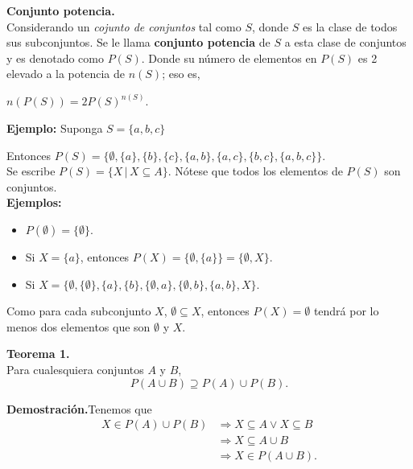\noindent \textbf{Conjunto potencia.} \\
Considerando un \textit{cojunto de conjuntos} tal como $S$, donde $S$ es la clase de todos sus subconjuntos. Se le llama \textbf{conjunto potencia} de $S$ a esta clase de conjuntos y es denotado como $P(S)$. 
Donde su n\'umero de elementos en $P(S)$ es 2 elevado a la potencia de $n(S)$; eso es,

    \begin{center}
        $n(P(S)) = 2 P(S)^{n(S)}$.
    \end{center}

    \textbf{Ejemplo:}
        Suponga $S = \lbrace a,b,c\rbrace$ \\ \vspace{5px}

        Entonces $P(S) = \lbrace \emptyset, \lbrace a\rbrace,  \lbrace b\rbrace,  \lbrace c\rbrace,  \lbrace a, b\rbrace,  \lbrace a, c\rbrace, \lbrace b, c\rbrace, \lbrace a,b,c\rbrace \rbrace$.\\

    Se escribe $P(S) = \{X \,|\, X \subseteq A\}$. Nótese que todos los elementos de $P(S)$ son conjuntos.\\



\textbf{Ejemplos:} 
\begin{itemize}
    \item $P(\emptyset) = \{\emptyset\}$.
    \item Si $X = \{a\}$, entonces $P(X) = \{\emptyset, \{a\}\} = \{\emptyset, X\}$.
    \item Si $X = \{\emptyset, \{\emptyset\}, \{a\}, \{b\}, \{\emptyset, a\}, \{\emptyset, b\}, \{a, b\}, X\}$.
\end{itemize}


Como para cada subconjunto $X$, $\emptyset \subseteq X$, entonces $P(X) = \emptyset$ tendrá por lo menos dos elementos que son $\emptyset$ y $X$.

\textbf{Teorema 1.} \\
Para cualesquiera conjuntos $A$ y $B$, $$P(A \cup B) \supseteq P(A) \cup P(B).$$

\textbf{Demostración.}Tenemos que 
\begin{align*}
X \in P(A) \cup P(B) &\Rightarrow X \subseteq A \lor X \subseteq B \\
&\Rightarrow X \subseteq A \cup B \\
&\Rightarrow X \in P(A \cup B).
\end{align*}


